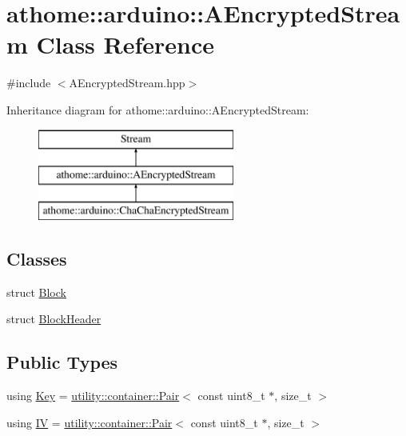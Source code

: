 \hypertarget{classathome_1_1arduino_1_1_a_encrypted_stream}{}\section{athome\+:\+:arduino\+:\+:A\+Encrypted\+Stream Class Reference}
\label{classathome_1_1arduino_1_1_a_encrypted_stream}


{\ttfamily \#include $<$A\+Encrypted\+Stream.\+hpp$>$}

Inheritance diagram for athome\+:\+:arduino\+:\+:A\+Encrypted\+Stream\+:\begin{figure}[H]
\begin{center}
\leavevmode
\includegraphics[height=3.000000cm]{classathome_1_1arduino_1_1_a_encrypted_stream}
\end{center}
\end{figure}
\subsection*{Classes}
\begin{DoxyCompactItemize}
\item 
struct \mbox{\hyperlink{structathome_1_1arduino_1_1_a_encrypted_stream_1_1_block}{Block}}
\item 
struct \mbox{\hyperlink{structathome_1_1arduino_1_1_a_encrypted_stream_1_1_block_header}{Block\+Header}}
\end{DoxyCompactItemize}
\subsection*{Public Types}
\begin{DoxyCompactItemize}
\item 
using \mbox{\hyperlink{classathome_1_1arduino_1_1_a_encrypted_stream_a2f0fd4a9c2a74a4ae857a4447aa3956f}{Key}} = \mbox{\hyperlink{classathome_1_1utility_1_1container_1_1_pair}{utility\+::container\+::\+Pair}}$<$ const uint8\+\_\+t $\ast$, size\+\_\+t $>$
\item 
using \mbox{\hyperlink{classathome_1_1arduino_1_1_a_encrypted_stream_a4a0c027bc7503bb0da538d6a2f0657e6}{IV}} = \mbox{\hyperlink{classathome_1_1utility_1_1container_1_1_pair}{utility\+::container\+::\+Pair}}$<$ const uint8\+\_\+t $\ast$, size\+\_\+t $>$
\end{DoxyCompactItemize}

